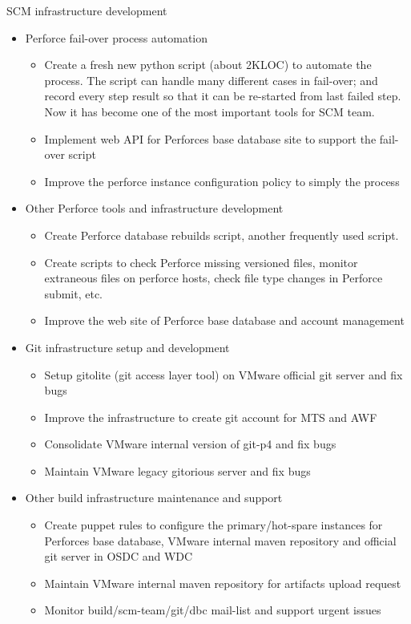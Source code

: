 \documentclass[10pt,letterpaper]{article}
\begin{document}
{\headedsubsection %
{SCM infrastructure development} {}
{
    \begin{itemize}
        \item Perforce fail-over process automation
            \begin{itemize}
                \item Create a fresh new python script (about 2KLOC) to automate the process.
                    The script can handle many different cases in fail-over; and record every
                    step result so that it can be re-started from last failed step. Now it has
                    become one of the most important tools for SCM team.
                \item Implement web API for Perforces base database site to support the
                    fail-over script
                \item Improve the perforce instance configuration policy to simply the
                    process
            \end{itemize}
        \item Other Perforce tools and infrastructure development
            \begin{itemize}
            \item   Create Perforce database rebuilds script, another frequently used
            script.
            \item   Create scripts to check Perforce missing versioned files, monitor
            extraneous files on perforce hosts, check file type changes in Perforce
            submit, etc.
            \item   Improve the web site of Perforce base database and account management
            \end{itemize}
        \item Git infrastructure setup and development
            \begin{itemize}
            \item   Setup gitolite (git access layer tool) on VMware official git server
            and fix bugs
            \item   Improve the infrastructure to create git account for MTS and AWF
            \item   Consolidate VMware internal version of git-p4 and fix bugs
            \item   Maintain VMware legacy gitorious server and fix bugs
            \end{itemize}
        \item Other build infrastructure maintenance and support
            \begin{itemize}
            \item   Create puppet rules to configure the primary/hot-spare instances for
            Perforces base database, VMware internal maven repository and official git
            server in OSDC and WDC
            \item   Maintain VMware internal maven repository for artifacts upload request
            \item   Monitor build/scm-team/git/dbc mail-list and support urgent issues
            \end{itemize}


\end{itemize}}}
\end{document}
